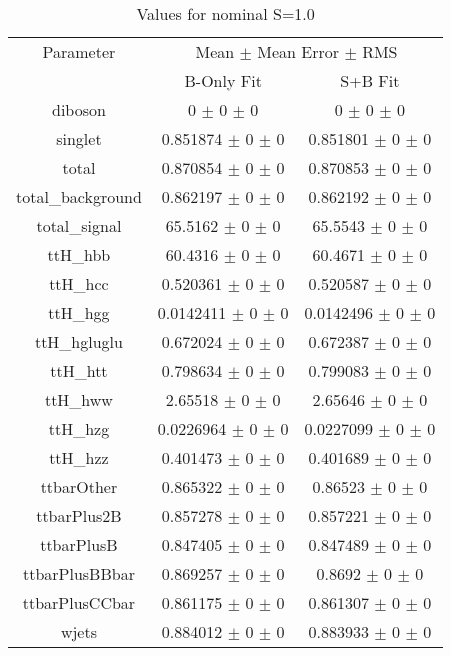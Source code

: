 \begin{table}
\centering
\caption{Values for nominal S=1.0}
\begin{tabular}{ccc}
\toprule
Parameter 	& \multicolumn{2}{c}{Mean $\pm$ Mean Error $\pm$ RMS}\\
 	& B-Only Fit & S+B Fit\\
\midrule
diboson 	& \num{0} $\pm$ \num{0} $\pm$ \num{0} 	& \num{0} $\pm$ \num{0} $\pm$ \num{0}\\
singlet 	& \num{0.851874} $\pm$ \num{0} $\pm$ \num{0} 	& \num{0.851801} $\pm$ \num{0} $\pm$ \num{0}\\
total 	& \num{0.870854} $\pm$ \num{0} $\pm$ \num{0} 	& \num{0.870853} $\pm$ \num{0} $\pm$ \num{0}\\
total\_background 	& \num{0.862197} $\pm$ \num{0} $\pm$ \num{0} 	& \num{0.862192} $\pm$ \num{0} $\pm$ \num{0}\\
total\_signal 	& \num{65.5162} $\pm$ \num{0} $\pm$ \num{0} 	& \num{65.5543} $\pm$ \num{0} $\pm$ \num{0}\\
ttH\_hbb 	& \num{60.4316} $\pm$ \num{0} $\pm$ \num{0} 	& \num{60.4671} $\pm$ \num{0} $\pm$ \num{0}\\
ttH\_hcc 	& \num{0.520361} $\pm$ \num{0} $\pm$ \num{0} 	& \num{0.520587} $\pm$ \num{0} $\pm$ \num{0}\\
ttH\_hgg 	& \num{0.0142411} $\pm$ \num{0} $\pm$ \num{0} 	& \num{0.0142496} $\pm$ \num{0} $\pm$ \num{0}\\
ttH\_hgluglu 	& \num{0.672024} $\pm$ \num{0} $\pm$ \num{0} 	& \num{0.672387} $\pm$ \num{0} $\pm$ \num{0}\\
ttH\_htt 	& \num{0.798634} $\pm$ \num{0} $\pm$ \num{0} 	& \num{0.799083} $\pm$ \num{0} $\pm$ \num{0}\\
ttH\_hww 	& \num{2.65518} $\pm$ \num{0} $\pm$ \num{0} 	& \num{2.65646} $\pm$ \num{0} $\pm$ \num{0}\\
ttH\_hzg 	& \num{0.0226964} $\pm$ \num{0} $\pm$ \num{0} 	& \num{0.0227099} $\pm$ \num{0} $\pm$ \num{0}\\
ttH\_hzz 	& \num{0.401473} $\pm$ \num{0} $\pm$ \num{0} 	& \num{0.401689} $\pm$ \num{0} $\pm$ \num{0}\\
ttbarOther 	& \num{0.865322} $\pm$ \num{0} $\pm$ \num{0} 	& \num{0.86523} $\pm$ \num{0} $\pm$ \num{0}\\
ttbarPlus2B 	& \num{0.857278} $\pm$ \num{0} $\pm$ \num{0} 	& \num{0.857221} $\pm$ \num{0} $\pm$ \num{0}\\
ttbarPlusB 	& \num{0.847405} $\pm$ \num{0} $\pm$ \num{0} 	& \num{0.847489} $\pm$ \num{0} $\pm$ \num{0}\\
ttbarPlusBBbar 	& \num{0.869257} $\pm$ \num{0} $\pm$ \num{0} 	& \num{0.8692} $\pm$ \num{0} $\pm$ \num{0}\\
ttbarPlusCCbar 	& \num{0.861175} $\pm$ \num{0} $\pm$ \num{0} 	& \num{0.861307} $\pm$ \num{0} $\pm$ \num{0}\\
wjets 	& \num{0.884012} $\pm$ \num{0} $\pm$ \num{0} 	& \num{0.883933} $\pm$ \num{0} $\pm$ \num{0}\\
\bottomrule
\end{tabular}
\end{table}